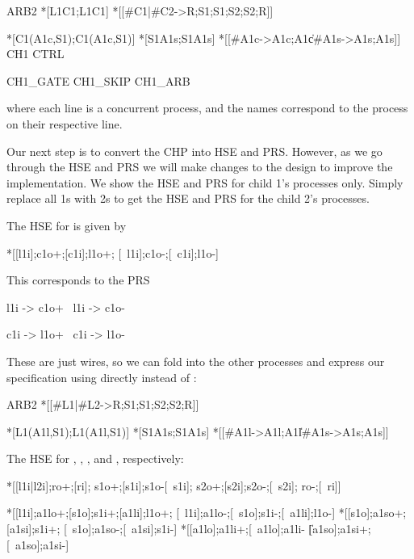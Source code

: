 \documentclass[aer.tex]{subfiles}
\begin{document}
\begin{csp}
ARB2\equiv
  *[L1\star\!C1;L1\star\!C1]
  *[[#{C1}|#{C2}->R;S1;S1;S2;S2;R]]

  *[C1\star(A1c,S1);C1\star(A1c,S1)]
  *[S1\star\!A1s;S1\star\!A1s]
  *[[#{A1c}->A1c;A1c\|#{A1s}->A1s;A1s]]
\equiv
  CH1
  CTRL 
 
  CH1_GATE
  CH1_SKIP
  CH1_ARB
\end{csp}

\noindent where each line is a concurrent process,
and the names correspond to the process on their respective line. 

Our next step is to convert the CHP into HSE and PRS.
However, as we go through the HSE and PRS we will make changes
to the design to improve the implementation.
We show the HSE and PRS for child 1's processes only. 
Simply replace all 1s with 2s to get the HSE and PRS for the child 2's processes.

\noindent The HSE for  is given by

\begin{hse}
  *[[l1i];c1o+;[c1i];l1o+;
    [~l1i];c1o-;[~c1i];l1o-]
\end{hse}

\noindent This corresponds to the PRS 

\begin{prs2}
l1i -> c1o+
~l1i -> c1o-

c1i -> l1o+
~c1i -> l1o-
\end{prs2}

\noindent These are just wires, so we can fold  into the other processes
and express our specification using  directly instead of :

\begin{csp}
ARB2\equiv
  *[[#{L1}|#{L2}->R;S1;S1;S2;S2;R]]

  *[L1\star(A1l,S1);L1\star(A1l,S1)]
  *[S1\star\!A1s;S1\star\!A1s]
  *[[#{A1l}->A1l;A1l\|#{A1s}->A1s;A1s]]
\end{csp}

\noindent The HSE for , , , and , respectively:

\begin{hse}
  *[[l1i|l2i];ro+;[ri];
    s1o+;[s1i];s1o-[~s1i];
    s2o+;[s2i];s2o-;[~s2i];
    ro-;[~ri]]
    
  *[[l1i];a1lo+;[s1o];s1i+;[a1li];l1o+;
    [~l1i];a1lo-;[~s1o];s1i-;[~a1li];l1o-]
  *[[s1o];a1so+;[a1si];s1i+;
    [~s1o];a1so-;[~a1si];s1i-]
  *[[a1lo];a1li+;[~a1lo];a1li-
   \|[a1so];a1si+;[~a1so];a1si-]
\end{hse}
\end{document}
